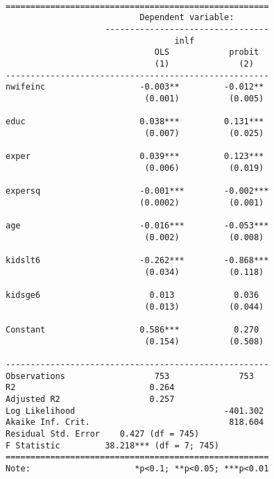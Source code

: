 \documentclass[
  letterpaper,
  DIV=11,
  numbers=noendperiod]{scrreprt}
\begin{document}
\begin{verbatim}

=====================================================
                           Dependent variable:       
                    ---------------------------------
                                  inlf               
                              OLS            probit  
                              (1)              (2)   
-----------------------------------------------------
nwifeinc                   -0.003**         -0.012** 
                            (0.001)          (0.005) 
                                                     
educ                       0.038***         0.131*** 
                            (0.007)          (0.025) 
                                                     
exper                      0.039***         0.123*** 
                            (0.006)          (0.019) 
                                                     
expersq                    -0.001***        -0.002***
                           (0.0002)          (0.001) 
                                                     
age                        -0.016***        -0.053***
                            (0.002)          (0.008) 
                                                     
kidslt6                    -0.262***        -0.868***
                            (0.034)          (0.118) 
                                                     
kidsge6                      0.013            0.036  
                            (0.013)          (0.044) 
                                                     
Constant                   0.586***           0.270  
                            (0.154)          (0.508) 
                                                     
-----------------------------------------------------
Observations                  753              753   
R2                           0.264                   
Adjusted R2                  0.257                   
Log Likelihood                              -401.302 
Akaike Inf. Crit.                            818.604 
Residual Std. Error    0.427 (df = 745)              
F Statistic         38.218*** (df = 7; 745)          
=====================================================
Note:                     *p<0.1; **p<0.05; ***p<0.01
\end{verbatim}
\end{document}
